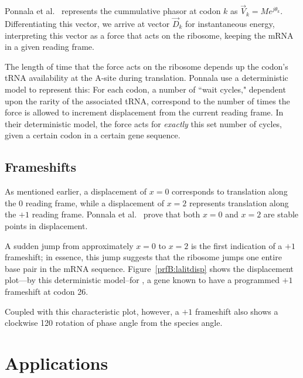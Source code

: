 \documentclass[12pt]{article}
\begin{document}
Ponnala et al.~\cite{lalit:embs} represents the cummulative phasor at codon $k$ as $\vec{V}_k = Me^{j\theta_k}$.
Differentiating this vector, we arrive at vector $\vec{D}_k$ for instantaneous energy, interpreting this
vector as a force that acts on the ribosome, keeping the mRNA in a given reading frame.

The length of time that the force acts on the ribosome depends up the codon's tRNA availability at the A-site during translation.
Ponnala use a deterministic model to represent this: For each codon, a number
of ``wait cycles," dependent upon the rarity of the associated tRNA, correspond to the number
of times the force is allowed to increment displacement from the current reading frame.
In their deterministic model, the force acts for \emph{exactly} this set number of cycles, given a certain codon in a certain gene sequence.

\subsection{Frameshifts}


As mentioned earlier, a displacement of $x = 0$ corresponds to translation along the 0 reading frame,
while a displacement of $x = 2$ represents translation along the $+1$ reading frame.
Ponnala et al.~\cite{lalit:embs} prove that both $x = 0$ and $x = 2$ are stable points in displacement.


A sudden jump from approximately $x = 0$ to $x = 2$ is the first indication of a $+1$ frameshift; 
in essence, this jump suggests that the ribosome jumps one entire base pair in the mRNA sequence.
Figure~\ref{prfB:lalitdisp} shows the displacement plot---by this deterministic model--for \prfB, 
a gene known to have a programmed $+1$ frameshift at codon 26.

Coupled with this characteristic plot, however, a $+1$ frameshift also shows a clockwise 120\degree
rotation of phase angle from the species angle.   

\section{Applications}
\end{document}
